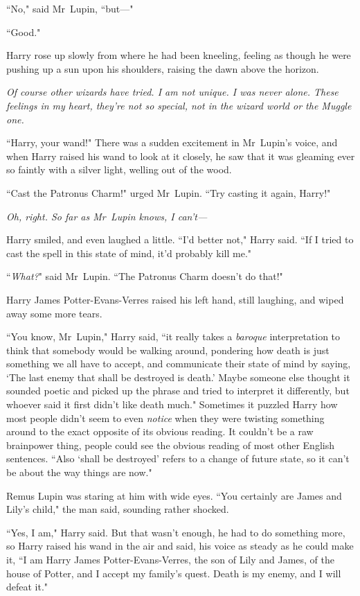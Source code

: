 ``No," said Mr~Lupin, ``but—"

``Good."

Harry rose up slowly from where he had been kneeling, feeling as though he were pushing up a sun upon his shoulders, raising the dawn above the horizon.

\emph{Of \emph{course} other wizards have tried. I am not unique. I was never alone. These feelings in my heart, they're not so special, not in the wizard world or the Muggle one.}

``Harry, your wand!" There was a sudden excitement in Mr~Lupin's voice, and when Harry raised his wand to look at it closely, he saw that it was gleaming ever so faintly with a silver light, welling out of the wood.

``Cast the Patronus Charm!" urged Mr~Lupin. ``Try casting it again, Harry!"

\emph{Oh, right. So far as Mr~Lupin knows, I can't—}

Harry smiled, and even laughed a little. ``I'd better not," Harry said. ``If I tried to cast the spell in this state of mind, it'd probably kill me."

``\emph{What?}" said Mr~Lupin. ``The Patronus Charm doesn't do that!"

Harry James Potter-Evans-Verres raised his left hand, still laughing, and wiped away some more tears.

``You know, Mr~Lupin," Harry said, ``it really takes a \emph{baroque} interpretation to think that somebody would be walking around, pondering how death is just something we all have to accept, and communicate their state of mind by saying, `The last enemy that shall be destroyed is death.' Maybe someone else thought it sounded poetic and picked up the phrase and tried to interpret it differently, but whoever said it first didn't like death much." Sometimes it puzzled Harry how most people didn't seem to even \emph{notice} when they were twisting something around to the exact opposite of its obvious reading. It couldn't be a raw brainpower thing, people could see the obvious reading of most other English sentences. ``Also `shall be destroyed' refers to a change of future state, so it can't be about the way things are now."

Remus Lupin was staring at him with wide eyes. ``You certainly are James and Lily's child," the man said, sounding rather shocked.

``Yes, I am," Harry said. But that wasn't enough, he had to do something more, so Harry raised his wand in the air and said, his voice as steady as he could make it, ``I am Harry James Potter-Evans-Verres, the son of Lily and James, of the house of Potter, and I accept my family's quest. Death is my enemy, and I will defeat it."

